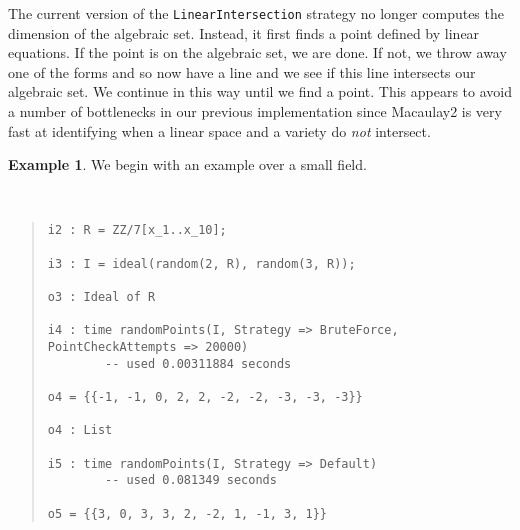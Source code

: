\documentclass[11pt]{amsart}
\theoremstyle{definition}
\newtheorem{example}{Example}[section]
\begin{document}
    The current version of the {\tt LinearIntersection} strategy no longer computes the dimension of the algebraic set.  Instead, it first finds a point defined by linear equations.  If the point is on the algebraic set, we are done.  If not, we throw away one of the forms and so now have a line and we see if this line intersects our algebraic set.  We continue in this way until we find a point.  This appears to avoid a number of bottlenecks in our previous implementation since Macaulay2 is very fast at identifying when a linear space and a variety do \emph{not} intersect.  
    


    \begin{example}
        We begin with an example over a small field.
    {{\small\color{blue}
    ~~
    \begin{quote}
\begin{verbatim}
i2 : R = ZZ/7[x_1..x_10];

i3 : I = ideal(random(2, R), random(3, R));

o3 : Ideal of R

i4 : time randomPoints(I, Strategy => BruteForce, PointCheckAttempts => 20000)
        -- used 0.00311884 seconds        

o4 = {{-1, -1, 0, 2, 2, -2, -2, -3, -3, -3}}

o4 : List

i5 : time randomPoints(I, Strategy => Default)
        -- used 0.081349 seconds          

o5 = {{3, 0, 3, 3, 2, -2, 1, -1, 3, 1}}
\end{verbatim}
\end{quote}\vspace{-1em}
    }}
    \end{example}    
\end{document}
